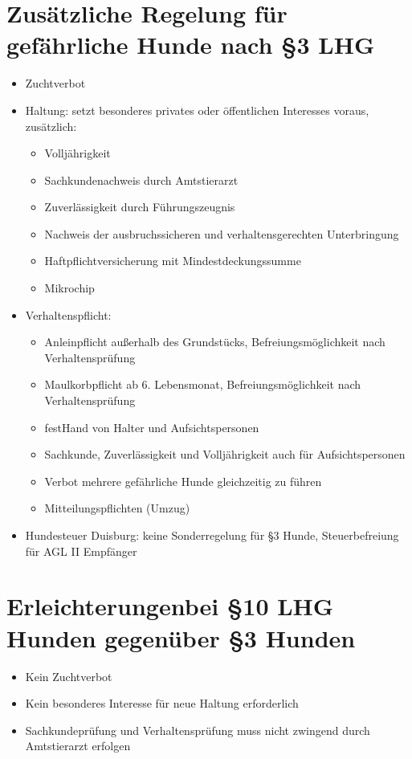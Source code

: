 \section{Zusätzliche Regelung für gefährliche Hunde nach §3 LHG}
    \begin{itemize}
        \item Zuchtverbot
        \item Haltung: setzt besonderes privates oder öffentlichen Interesses voraus, zusätzlich:
        \begin{itemize}
            \item Volljährigkeit
            \item Sachkundenachweis durch Amtstierarzt
            \item Zuverlässigkeit durch Führungszeugnis
            \item Nachweis der ausbruchssicheren und verhaltensgerechten Unterbringung
            \item Haftpflichtversicherung mit Mindestdeckungssumme
            \item Mikrochip
        \end{itemize}
        \item Verhaltenspflicht:
        \begin{itemize}
            \item Anleinpflicht außerhalb des Grundstücks, Befreiungsmöglichkeit nach Verhaltensprüfung
            \item Maulkorbpflicht ab 6. Lebensmonat, Befreiungsmöglichkeit nach Verhaltensprüfung
            \item \glqq fest\grqq Hand von Halter und Aufsichtspersonen
            \item Sachkunde, Zuverlässigkeit und Volljährigkeit auch für Aufsichtspersonen
            \item Verbot mehrere gefährliche Hunde gleichzeitig zu führen
            \item Mitteilungspflichten (Umzug)
        \end{itemize}
        \item Hundesteuer Duisburg: keine Sonderregelung für §3 Hunde, Steuerbefreiung für AGL II Empfänger
    \end{itemize}

 \section{\glqq Erleichterungen\grqq bei §10 LHG Hunden gegenüber §3 Hunden}
    \begin{itemize}
           \item Kein Zuchtverbot
           \item Kein besonderes Interesse für neue Haltung erforderlich
           \item Sachkundeprüfung und Verhaltensprüfung muss nicht zwingend durch Amtstierarzt erfolgen
       \end{itemize}


